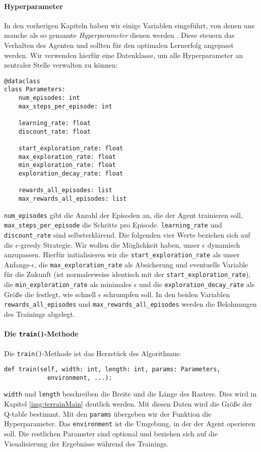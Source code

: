 \paragraph{Hyperparameter} \label{sec:qLearningHyperparameter}
In den vorherigen Kapiteln haben wir einige Variablen eingeführt, von denen uns manche als so genannte \textit{Hyperparameter} dienen werden \cite{08_ravichandiran2018hands}. Diese steuern das Verhalten des Agenten und sollten für den optimalen Lernerfolg angepasst werden. Wir verwenden hierfür eine Datenklasse, um alle Hyperparameter an zentraler Stelle verwalten zu können:
\begin{verbatim}
@dataclass
class Parameters:
    num_episodes: int
    max_steps_per_episode: int

    learning_rate: float
    discount_rate: float

    start_exploration_rate: float
    max_exploration_rate: float
    min_exploration_rate: float
    exploration_decay_rate: float

    rewards_all_episodes: list
    max_rewards_all_episodes: list
\end{verbatim}
\texttt{num_episodes} gibt die Anzahl der Episoden an, die der Agent trainieren soll, \linebreak\texttt{max_steps_per_episode} die Schritte pro Episode. \texttt{learning_rate} und \texttt{discount_rate} sind selbsterklärend. Die folgenden vier Werte beziehen sich auf die $ \epsilon $-greedy Strategie. Wir wollen die Möglichkeit haben, unser $ \epsilon $ dynamisch anzupassen. Hierfür initialisieren wir die \texttt{start_exploration_rate} als unser Anfangs-$ \epsilon $, die \texttt{max_exploration_rate} als Absicherung und eventuelle Variable für die Zukunft (ist normalerweise identisch mit der \texttt{start_exploration_rate}), die \texttt{min_exploration_rate} als minimales $ \epsilon $ und die \texttt{exploration_decay_rate} als Größe die festlegt, wie schnell $ \epsilon $ schrumpfen soll. In den beiden Variablen \texttt{rewards_all_episodes} und \texttt{max_rewards_all_episodes} werden die Belohnungen des Trainings abgelegt.

\paragraph{Die \texttt{train()}-Methode}
Die \texttt{train()}-Methode ist das Herzstück des Algorithmus:
\begin{verbatim}
def train(self, width: int, length: int, params: Parameters,
            environment, ...):
\end{verbatim}
\texttt{width} und \texttt{length} beschreiben die Breite und die Länge des Rasters. Dies wird in Kapitel \ref{img:terrainMain} deutlich werden. Mit diesen Daten wird die Größe der Q-table bestimmt. Mit den \texttt{params} übergeben wir der Funktion die Hyperparameter. Das \texttt{environment} ist die Umgebung, in der der Agent operieren soll. Die restlichen Parameter sind optional und beziehen sich auf die Visualisierung der Ergebnisse während des Trainings.

